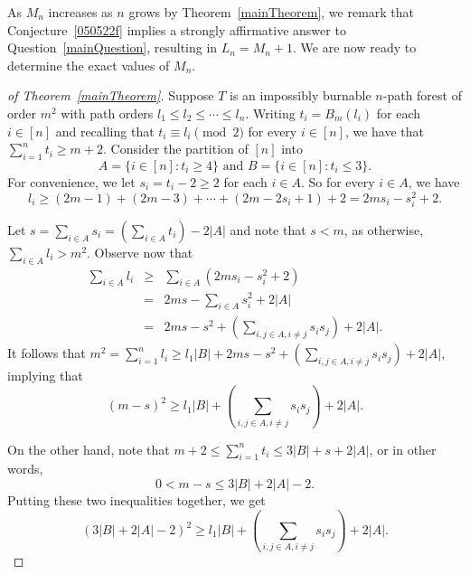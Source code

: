 \documentclass[
final
]{dmtcs-episciences}
\theoremstyle{definition}
\theoremstyle{remark}
\begin{document}
As $M_n$ increases as $n$ grows by Theorem~\ref{mainTheorem}, we remark that Conjecture~\ref{050522f} implies a strongly affirmative answer to Question~\ref{mainQuestion}, resulting in $L_n = M_n+1$. We are now ready to determine the exact values of $M_n$.

\begin{proof}[of Theorem~\ref{mainTheorem}]
	Suppose $T$ is an impossibly burnable $n$-path forest of order $m^2$ with path orders $l_1\le l_2\le \cdots \le l_n$.
	Writing $t_i=B_m(l_i)$ for each $i\in [n]$ and recalling that $t_i\equiv l_i\pmod 2$ for every $i\in [n]$, we have that $\sum_{i=1}^n t_i \ge m+2$.
	Consider the partition of $[n]$ into
	\begin{displaymath}
	A = \{i\in[n]:t_i\ge 4\} \mbox{ and } B = \{i\in [n]:t_i\le 3\}.
	\end{displaymath}
	For convenience, we let $s_i = t_i - 2\ge 2$ for each $i\in A$.
	So for every $i\in A$, we have
	\begin{displaymath}
	l_i  \ge  (2m-1) + (2m-3) + \cdots + (2m - 2s_i + 1) + 2 =  2ms_i - s_i^2 + 2.
	\end{displaymath}
	
	Let $s = \sum_{i\in A} s_i = \left(\sum_{i\in A}t_i\right) - 2|A|$ and note that $s<m$, as otherwise, $\sum_{i\in A}l_i > m^2$.
	Observe now that
	\begin{eqnarray*}
	\sum_{i\in A} l_i &\ge & \sum_{i\in A} (2ms_i - s_i^2 +2)\\
	& = & 2ms - \sum_{i\in A} s_i^2 + 2|A|\\
&	=  & 2ms - s^2 + \left(\sum_{i,j\in A, i\ne j}s_is_j\right)+2|A|.
	\end{eqnarray*}
	It follows that $m^2 = \sum_{i=1}^n l_i \ge l_1|B| + 2ms - s^2 + \left(\sum_{i,j\in A,i\ne j }s_is_j\right)+2|A|$, implying that
	\begin{displaymath}
	(m-s)^2 \ge l_1|B| + \left(\sum_{i,j\in A, i\ne j}s_is_j\right) + 2|A|.
	\end{displaymath}
	
	On the other hand, note that $m+2 \le \sum_{i=1}^n t_i \le 3|B| + s + 2|A|$, or in other words,
	\begin{displaymath}
	0 < m - s \le 3|B| + 2|A| - 2.
	\end{displaymath}
	Putting these two inequalities together, we get
	\begin{equation}\label{mainInq}
	\left(3|B| + 2|A| - 2\right)^2 \ge l_1|B| + \left(\sum_{i,j\in A, i\ne j}s_is_j\right) + 2|A|.
	\end{equation}
	

\end{proof}
\end{document}
